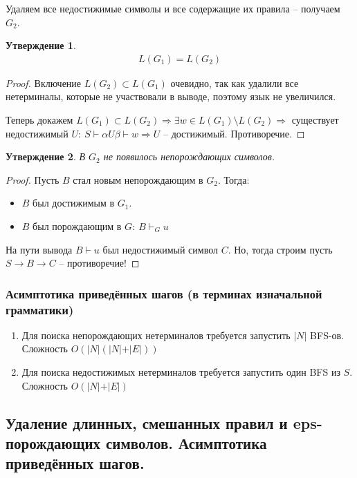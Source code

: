 \documentclass[a4paper,12pt]{article}
\theoremstyle{plain}
\newtheorem{proposition}{Утверждение}[subsection]
\theoremstyle{definition}
\theoremstyle{remark}
\begin{document}
Удаляем все недостижимые символы и все содержащие их правила -- получаем $G_2$.

\begin{proposition}
	\begin{align*}
		L(G_1) = L(G_2)
	\end{align*}
\end{proposition}

\begin{proof}
	Включение $L(G_2) \subset L(G_1)$ очевидно, так как удалили все нетерминалы, которые не участвовали в выводе, поэтому язык не увеличился.

	Теперь докажем $L(G_1) \subset L(G_2) \Rightarrow \exists w \in L(G_1) \setminus L(G_2) \Rightarrow$ существует недостижимый $U :\: S \vdash \alpha U \beta \vdash w \Rightarrow U$ -- достижимый. Противоречие.
\end{proof}

\begin{proposition}
	В $G_2$ не появилось непорождающих символов.
\end{proposition}

\begin{proof}
	Пусть $B$ стал новым непорождающим в $G_2$. Тогда:
	\begin{itemize}
		\item $B$ был достижимым в $G_1$.
		\item $B$ был порождающим в $G :\: B \vdash_G u$
	\end{itemize}
	На пути вывода $B \vdash u$ был недостижимый символ $C$. Но, тогда строим пусть $S \to B \to C$ -- противоречие!
\end{proof}

\subsubsection*{Асимптотика приведённых шагов (в терминах изначальной грамматики)}
\begin{enumerate}
	\item Для поиска непорождающих нетерминалов требуется запустить $\vert N \vert$ BFS-ов. Сложность $O(\vert N \vert (\vert N\vert + \vert E \vert))$
	\item Для поиска недостижимых нетерминалов требуется запустить один BFS из $S$. Сложность $O(\vert N\vert + \vert E \vert)$
\end{enumerate}

\subsection{Удаление длинных, смешанных правил и eps-порождающих символов. Асимптотика приведённых шагов.}
\end{document}
